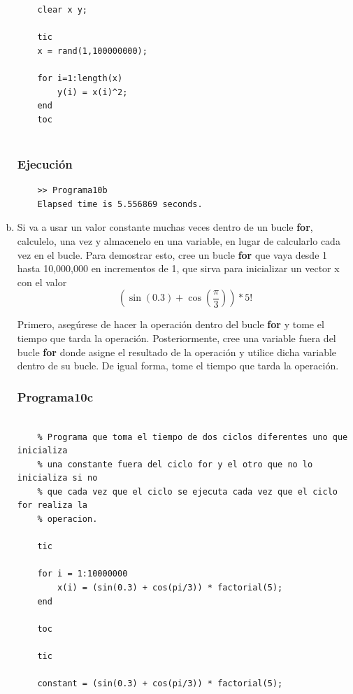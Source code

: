 \documentclass{article}
\begin{document}
\begin{enumerate}[a)]
\begin{lstlisting}
	clear x y;
	
	tic
	x = rand(1,100000000);
	
	for i=1:length(x)
		y(i) = x(i)^2;
	end
	toc
	
	\end{lstlisting}
	
	\subsubsection{Ejecución}
	
	\begin{lstlisting}
	>> Programa10b
	Elapsed time is 5.556869 seconds.
	\end{lstlisting}
	
	\item Si va a usar un valor constante muchas veces dentro de un bucle \textbf{for}, calculelo, una vez y almacenelo en una variable, en lugar de calcularlo cada vez en el bucle. Para demostrar esto, cree un bucle \textbf{for} que vaya desde 1 hasta 10,000,000 en incrementos de 1, que sirva para inicializar un vector x con el valor
	\begin{equation*}
		(\sin(0.3) + \cos(\frac{\pi}{3})) * 5!
	\end{equation*}
	
	Primero, asegúrese de hacer la operación dentro del bucle \textbf{for} y tome el tiempo que tarda la operación. Posteriormente, cree una variable fuera del bucle \textbf{for} donde asigne el resultado de la operación y utilice dicha variable dentro de su bucle. De igual forma, tome el tiempo que tarda la operación.
	
	\subsubsection{Programa10c}
	
	\begin{lstlisting}
	
	% Programa que toma el tiempo de dos ciclos diferentes uno que inicializa
	% una constante fuera del ciclo for y el otro que no lo inicializa si no 
	% que cada vez que el ciclo se ejecuta cada vez que el ciclo for realiza la
	% operacion.
	
	tic
	
	for i = 1:10000000
		x(i) = (sin(0.3) + cos(pi/3)) * factorial(5);
	end
	
	toc
	
	tic
	
	constant = (sin(0.3) + cos(pi/3)) * factorial(5);
	

\end{lstlisting}
\end{enumerate}
\end{document}
